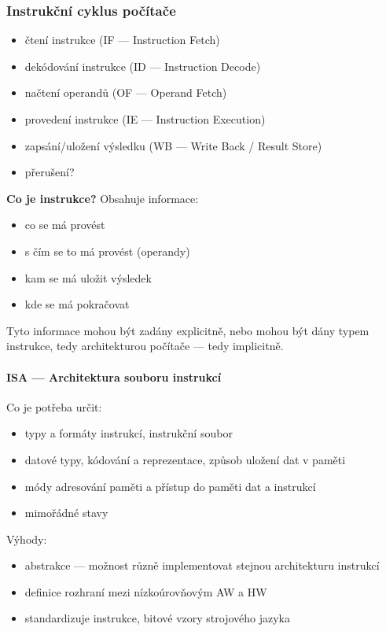 \subsubsection*{Instrukční cyklus počítače}
\begin{itemize}
	\item čtení instrukce (IF --- Instruction Fetch)
	\item dekódování instrukce (ID --- Instruction Decode)
	\item načtení operandů (OF --- Operand Fetch)
	\item provedení instrukce (IE --- Instruction Execution)
	\item zapsání/uložení výsledku (WB --- Write Back / Result Store)
	\item přerušení?
\end{itemize}

\textbf{Co je instrukce?}
Obsahuje informace:
\begin{itemize}
	\item co se má provést
	\item s čím se to má provést (operandy)
	\item kam se má uložit výsledek
	\item kde se má pokračovat
\end{itemize}

Tyto informace mohou být zadány explicitně, nebo mohou být dány typem instrukce, tedy architekturou počítače --- tedy implicitně.

\paragraph*{ISA --- Architektura souboru instrukcí}

Co je potřeba určit:
\begin{itemize}
	\item typy a formáty instrukcí, instrukční soubor
	\item datové typy, kódování a reprezentace, způsob uložení dat v paměti
	\item módy adresování paměti a přístup do paměti dat a instrukcí
	\item mimořádné stavy
\end{itemize}
Výhody:
\begin{itemize}
	\item abstrakce --- možnost různě implementovat stejnou architekturu instrukcí
	\item definice rozhraní mezi nízkoúrovňovým AW a HW
	\item standardizuje instrukce, bitové vzory strojového jazyka
\end{itemize}

